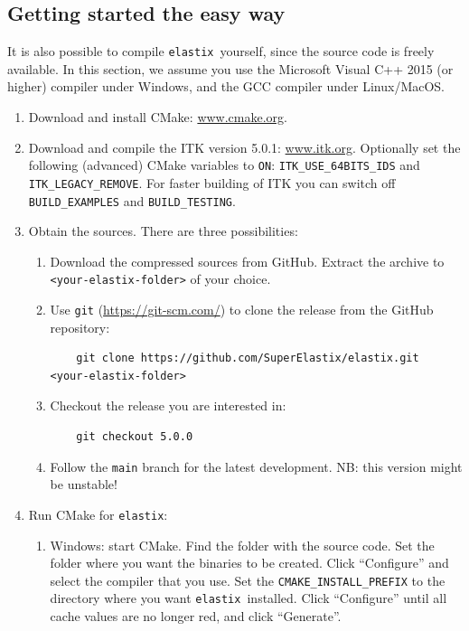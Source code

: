 \documentclass[]{report}
\newcommand{\elastix}{\texttt{elastix}}
\begin{document}
\subsection{Getting started the easy way}

It is also possible to compile \elastix\ yourself, since the source
code is freely available. In this section, we assume you use the
Microsoft Visual C++ 2015 (or higher) compiler under Windows, and
the GCC compiler under Linux/MacOS.

\begin{enumerate}
\item Download and install CMake: \url{www.cmake.org}.

\item Download and compile the ITK version 5.0.1: \url{www.itk.org}.
    Optionally set the following (advanced) CMake variables to
    \texttt{ON}: \texttt{ITK\_USE\_64BITS\_IDS}
    and \texttt{ITK\_LEGACY\_REMOVE}. For faster building of ITK
    you can switch off \texttt{BUILD\_EXAMPLES} and
    \texttt{BUILD\_TESTING}.

\item Obtain the sources. There are three possibilities:
  \begin{enumerate}
  \item Download the compressed sources from GitHub. Extract the
      archive to \texttt{<your-elastix-folder>} of your choice.
  \item Use \texttt{git} (\url{https://git-scm.com/})
      to clone the release from the GitHub repository:
    \begin{verbatim}
    git clone https://github.com/SuperElastix/elastix.git <your-elastix-folder>
    \end{verbatim}
  \item Checkout the release you are interested in:
    \begin{verbatim}
    git checkout 5.0.0
    \end{verbatim}
  \item Follow the \texttt{main} branch for the latest development.
    NB: this version might be unstable!
  \end{enumerate}

\item Run CMake for \elastix:
    \begin{enumerate}
    \item Windows: start CMake. Find the folder with the
        source code. Set the folder where you want the binaries to be
        created. Click ``Configure'' and select the compiler that you
        use. Set the \texttt{CMAKE\_INSTALL\_PREFIX} to the directory
        where you want \elastix\ installed. Click ``Configure'' until
        all cache values are no longer red, and click ``Generate''.


\end{enumerate}
\end{enumerate}
\end{document}
